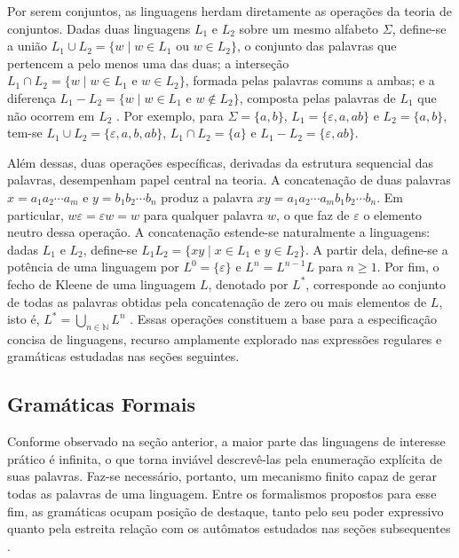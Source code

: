 \documentclass[
    12pt
    ,oneside
    ,a4paper
    ,chapter=TITLE
    ,section=TITLE
    ,sumario=abnt-6027-2012]{abntex2}
\begin{document}
Por serem conjuntos, as linguagens herdam diretamente as operações da teoria de
conjuntos. Dadas duas linguagens $L_1$ e $L_2$ sobre um mesmo alfabeto $\Sigma$,
define-se a união $L_1 \cup L_2 = \{w \mid w \in L_1 \text{ ou } w \in L_2\}$, o
conjunto das palavras que pertencem a pelo menos uma das duas; a interseção
$L_1 \cap L_2 = \{w \mid w \in L_1 \text{ e } w \in L_2\}$, formada pelas palavras
comuns a ambas; e a diferença $L_1 - L_2 = \{w \mid w \in L_1 \text{ e } w \notin L_2\}$,
composta pelas palavras de $L_1$ que não ocorrem em $L_2$ \cite{diverio2011,vieira2004}. Por exemplo, para
$\Sigma = \{a, b\}$, $L_1 = \{\varepsilon, a, ab\}$ e $L_2 = \{a, b\}$, tem-se
$L_1 \cup L_2 = \{\varepsilon, a, b, ab\}$, $L_1 \cap L_2 = \{a\}$ e
$L_1 - L_2 = \{\varepsilon, ab\}$.

Além dessas, duas operações específicas, derivadas da estrutura sequencial das
palavras, desempenham papel central na teoria. A
concatenação de duas palavras $x = a_1 a_2 \cdots a_m$ e $y = b_1 b_2 \cdots b_n$
produz a palavra $xy = a_1 a_2 \cdots a_m b_1 b_2 \cdots b_n$. Em particular,
$w\varepsilon = \varepsilon w = w$ para qualquer palavra $w$, o que faz de $\varepsilon$
o elemento neutro dessa operação. A concatenação estende-se naturalmente a linguagens:
dadas $L_1$ e $L_2$, define-se $L_1 L_2 = \{xy \mid x \in L_1 \text{ e } y \in L_2\}$.
A partir dela, define-se a potência de uma linguagem por $L^0 = \{\varepsilon\}$ e
$L^n = L^{n-1} L$ para $n \geq 1$. Por fim, o fecho de Kleene de uma linguagem $L$,
denotado por $L^*$, corresponde ao conjunto de todas as palavras obtidas pela
concatenação de zero ou mais elementos de $L$, isto é,
$L^* = \bigcup_{n \in \mathbb{N}} L^n$ \cite{diverio2011,vieira2004}. Essas operações constituem a base para a
especificação concisa de linguagens, recurso amplamente explorado nas expressões
regulares e gramáticas estudadas nas seções seguintes.

\subsection{Gramáticas Formais}
\label{sec:gramaticas-formais}
Conforme observado na seção anterior, a maior parte das linguagens de interesse prático é
infinita, o que torna inviável descrevê-las pela enumeração explícita de suas palavras. Faz-se
necessário, portanto, um mecanismo finito capaz de gerar todas as palavras de uma linguagem.
Entre os formalismos propostos para esse fim, as gramáticas ocupam posição de destaque,
tanto pelo seu poder expressivo quanto pela estreita relação com os autômatos estudados nas
seções subsequentes \cite{lewis1998,vieira2004}.
\end{document}

